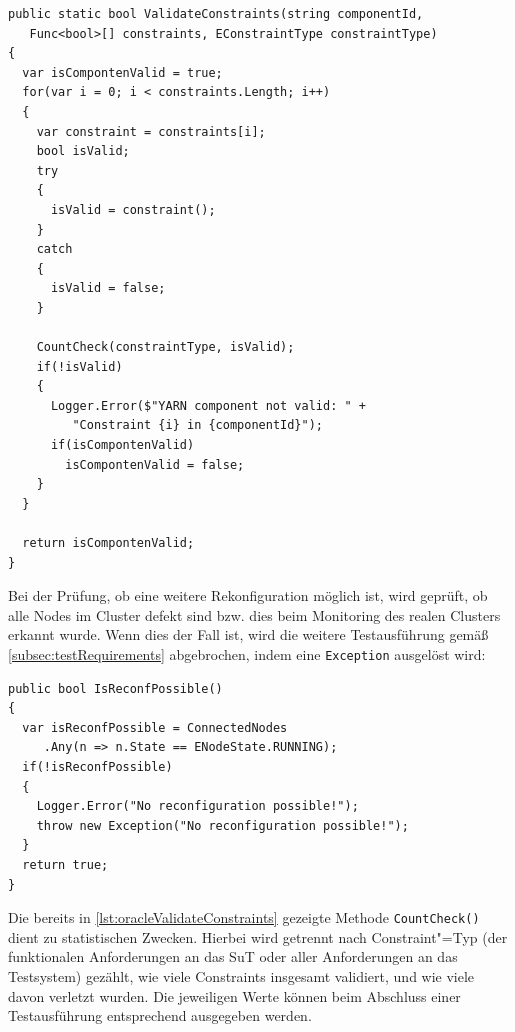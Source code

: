 \begin{lstlisting}[label=lst:oracleValidateConstraints,style=cs,
caption={[Validieren der Constraints durch das Oracle]
    Validieren der Constraints durch das Oracle.
    Die zu validierenden Constraints werden im Parameter \texttt{constraints} übergeben, der Parameter \texttt{constraintType} dient zu statistischen Zwecken in \texttt{CountCheck()}.}]
public static bool ValidateConstraints(string componentId,
   Func<bool>[] constraints, EConstraintType constraintType)
{
  var isCompontenValid = true;
  for(var i = 0; i < constraints.Length; i++)
  {
    var constraint = constraints[i];
    bool isValid;
    try
    {
      isValid = constraint();
    }
    catch
    {
      isValid = false;
    }
    
    CountCheck(constraintType, isValid);
    if(!isValid)
    {
      Logger.Error($"YARN component not valid: " +
         "Constraint {i} in {componentId}");
      if(isCompontenValid)
        isCompontenValid = false;
    }
  }
  
  return isCompontenValid;
}
\end{lstlisting}

Bei der Prüfung, ob eine weitere Rekonfiguration möglich ist, wird geprüft, ob alle Nodes im Cluster defekt sind bzw. dies beim Monitoring des realen Clusters erkannt wurde.
Wenn dies der Fall ist, wird die weitere Testausführung gemäß \cref{subsec:testRequirements} abgebrochen, indem eine \texttt{Exception} ausgelöst wird:

\begin{lstlisting}[label=lst:oracleIsReconfPossible,style=cs,
caption={Prüfung nach der Möglichkeit weiterer Rekonfigurationen}]
public bool IsReconfPossible()
{
  var isReconfPossible = ConnectedNodes
     .Any(n => n.State == ENodeState.RUNNING);
  if(!isReconfPossible)
  {
    Logger.Error("No reconfiguration possible!");
    throw new Exception("No reconfiguration possible!");
  }
  return true;
}
\end{lstlisting}

Die bereits in \cref{lst:oracleValidateConstraints} gezeigte Methode \texttt{CountCheck()} dient zu statistischen Zwecken.
Hierbei wird getrennt nach Constraint"=Typ (der funktionalen Anforderungen an das \gls{SuT} oder aller Anforderungen an das Testsystem) gezählt, wie viele Constraints insgesamt validiert, und wie viele davon verletzt wurden.
Die jeweiligen Werte können beim Abschluss einer Testausführung entsprechend ausgegeben werden.
